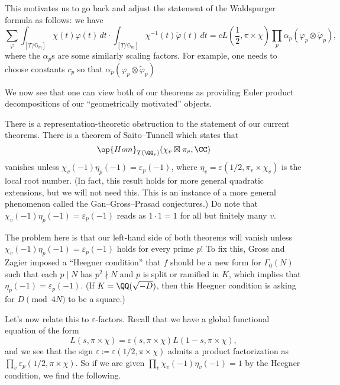 \documentclass[../notes.tex]{subfiles}
\begin{document}
This motivates us to go back and adjust the statement of the Waldspurger formula as follows: we have
\[\sum_\varphi\int_{[T/\mathbb G_m]}\chi(t)\varphi(t)\,dt\cdot\int_{[T/\mathbb G_m]}\chi^{-1}(t)\widetilde\varphi(t)\,dt=cL\left(\frac12,\pi\times\chi\right)\prod_p\alpha_p(\varphi_p\otimes\widetilde\varphi_p),\]
where the $\alpha_p$s are some similarly scaling factors. For example, one needs to choose constants $c_p$ so that $\alpha_p(\varphi_p\otimes\widetilde\varphi_p)$
\begin{remark}
	We now see that one can view both of our theorems as providing Euler product decompositions of our ``geometrically motivated'' objects.
\end{remark}
There is a representation-theoretic obstruction to the statement of our current theorems. There is a theorem of Saito--Tunnell which states that
\[\op{Hom}_{T(\QQ_v)}(\chi_v\boxtimes\pi_v,\CC)\]
vanishes unless $\chi_v(-1)\eta_p(-1)=\varepsilon_p(-1)$, where $\eta_v=\varepsilon(1/2,\pi_v\times\chi_v)$ is the local root number. (In fact, this result holds for more general quadratic extensions, but we will not need this. This is an instance of a more general phenomenon called the Gan--Gross--Prasad conjectures.) Do note that $\chi_v(-1)\eta_p(-1)=\varepsilon_p(-1)$ reads as $1\cdot1=1$ for all but finitely many $v$.

The problem here is that our left-hand side of both theorems will vanish unless $\chi_v(-1)\eta_p(-1)=\varepsilon_p(-1)$ holds for every prime $p$! To fix this, Gross and Zagier imposed a ``Heegner condition'' that $f$ should be a new form for $\Gamma_0(N)$ such that each $p\mid N$ has $p^2\nmid N$ and $p$ is split or ramified in $K$, which implies that $\eta_p(-1)=\varepsilon_p(-1)$. (If $K=\QQ(\sqrt{-D})$, then this Heegner condition is asking for $D\pmod{4N}$ to be a square.)

Let's now relate this to $\varepsilon$-factors. Recall that we have a global functional equation of the form
\[L(s,\pi\times\chi)=\varepsilon(s,\pi\times\chi) L(1-s,\pi\times\chi),\]
and we see that the sign $\varepsilon\coloneqq\varepsilon(1/2,\pi\times\chi)$ admits a product factorization as $\prod_v\varepsilon_p(1/2,\pi\times\chi)$. So if we are given $\prod_v\chi_v(-1)\eta_v(-1)=1$ by the Heegner condition, we find the following.
\end{document}
